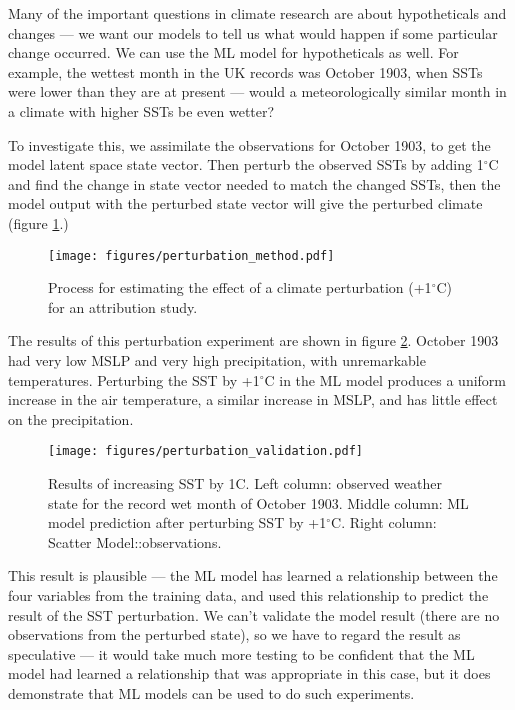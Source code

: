 \documentclass[gmd,manuscript]{copernicus}
\begin{document}
Many of the important questions in climate research are about hypotheticals and changes --- we want our models to tell us what would happen if some particular change occurred. We can use the ML model for hypotheticals as well. For example, the wettest month in the UK records was October 1903, when SSTs were lower than they are at present --- would a meteorologically similar month in a climate with higher SSTs be even wetter?

To investigate this, we assimilate the observations for October 1903, to get the model latent space state vector. Then perturb the observed SSTs by adding 1$^\circ$C and find the change in state vector needed to match the changed SSTs, then the model output with the perturbed state vector will give the perturbed climate (figure \ref{perturbation_method}.)

\begin{figure}[h]
\texttt{[image: figures/perturbation\_method.pdf]}
\caption{Process for estimating the effect of a climate perturbation (+1$^\circ$C) for an attribution study.}
\label{perturbation_method}
\end{figure}

The results of this perturbation experiment are shown in figure \ref{perturbation_validation}. October 1903 had very low MSLP and very high precipitation, with unremarkable temperatures. Perturbing the SST by +1$^\circ$C in the ML model produces a uniform increase in the air temperature, a similar increase in MSLP, and has little effect on the precipitation. 

\begin{figure}[h]
\texttt{[image: figures/perturbation\_validation.pdf]}
\caption{Results of increasing SST by 1C. Left column: observed weather state for the record wet month of October 1903. Middle column: ML model prediction after perturbing SST by +1$^\circ$C. Right column: Scatter Model::observations.}
\label{perturbation_validation}
\end{figure}
        
This result is plausible --- the ML model has learned a relationship between the four variables from the training data, and used this relationship to predict the result of the SST perturbation. We can't validate the model result (there are no observations from the perturbed state), so we have to regard the result as speculative --- it would take much more testing to be confident that the ML model had learned a relationship that was appropriate in this case, but it does demonstrate that ML models can be used to do such experiments.
\end{document}
